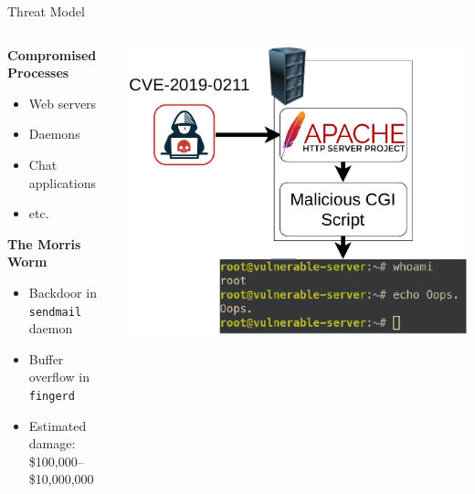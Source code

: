 \documentclass[12pt, dvipsnames, aspectratio=169]{beamer}
\begin{document}
\begin{frame}[t]{Threat Model}
\begin{columns}
    \begin{column}{0.45\textwidth}
        \textbf{Compromised Processes}
        \begin{itemize}
            \item Web servers
            \item Daemons
            \item Chat applications
            \item etc.
        \end{itemize}
        \vspace{2em}
        \textbf{The Morris Worm}
        \begin{itemize}
            \item Backdoor in \texttt{sendmail} daemon
            \item Buffer overflow in \texttt{fingerd}
            \item Estimated damage: \$100,000--\$10,000,000
        \end{itemize}
    \end{column}
    \begin{column}{0.55\textwidth}
        \color{black}
        \includegraphics[width=1\textwidth]{figs/threat-model.pdf}
    \end{column}
\end{columns}
\end{frame}
\end{document}
